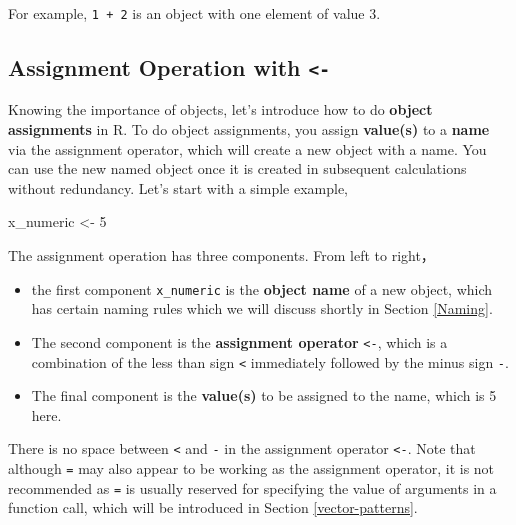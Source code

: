 \documentclass[
]{book}
\newenvironment{Shaded}{\begin{snugshade}}{\end{snugshade}}
\newcommand{\DecValTok}[1]{\textcolor[rgb]{0.00,0.00,0.81}{#1}}
\newcommand{\NormalTok}[1]{#1}
\newcommand{\OtherTok}[1]{\textcolor[rgb]{0.56,0.35,0.01}{#1}}
\providecommand{\tightlist}{%
  \setlength{\itemsep}{0pt}\setlength{\parskip}{0pt}}
\newenvironment{blackbox}{
  \definecolor{shadecolor}{rgb}{0, 0, 0}  %
  \color{white}
  \begin{shaded}}
 {\end{shaded}}
\newenvironment{infobox}[1]
  {
  \begin{itemize}
  \renewcommand{\labelitemi}{
    \raisebox{-.7\height}[0pt][0pt]{
      {\setkeys{Gin}{width=3em,keepaspectratio}
        \texttt{[image: pics/\#1]}}
    }
  }
  \setlength{\fboxsep}{1em}
  \begin{blackbox}
  \item
  }
  {
  \end{blackbox}
  \end{itemize}
  }
\begin{document}
For example, \texttt{1\ +\ 2} is an object with one element of value 3.

\hypertarget{assignment}{%
\subsection{\texorpdfstring{Assignment Operation with \texttt{\textless{}-}}{Assignment Operation with \textless-}}\label{assignment}}

Knowing the importance of objects, let's introduce how to do \textbf{object assignments} in R. To do object assignments, you assign \textbf{value(s)} to a \textbf{name} via the assignment operator, which will create a new object with a name. You can use the new named object once it is created in subsequent calculations without redundancy. Let's start with a simple example,

\begin{Shaded}
\begin{Highlighting}[]
\NormalTok{x\_numeric }\OtherTok{\textless{}{-}} \DecValTok{5}
\end{Highlighting}
\end{Shaded}

The assignment operation has three components. From left to right，

\begin{itemize}
\tightlist
\item
  the first component \texttt{x\_numeric} is the \textbf{object name} of a new object, which has certain naming rules which we will discuss shortly in Section \ref{Naming}.
\item
  The second component is the \textbf{assignment operator} \texttt{\textless{}-}, which is a combination of the less than sign \texttt{\textless{}} immediately followed by the minus sign \texttt{-}.
\item
  The final component is the \textbf{value(s)} to be assigned to the name, which is 5 here.
\end{itemize}

\begin{infobox}{caution}
There is no space between \texttt{\textless{}} and \texttt{-} in the assignment operator \texttt{\textless{}-}. Note that although \texttt{=} may also appear to be working as the assignment operator, it is not recommended as \texttt{=} is usually reserved for specifying the value of arguments in a function call, which will be introduced in Section \ref{vector-patterns}.

\end{infobox}
\end{document}

